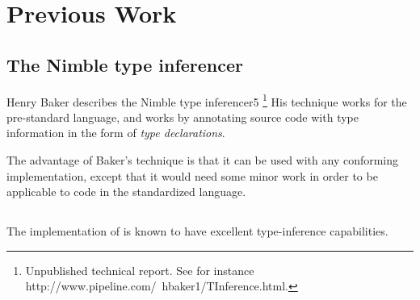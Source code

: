\section{Previous Work}

\subsection{The Nimble type inferencer}

Henry Baker describes the Nimble type inferencer5
\footnote{Unpublished technical report.  See for instance
  http://www.pipeline.com/~hbaker1/TInference.html.}  His technique
works for the pre-standard \commonlisp{} language, and works by
annotating source code with type information in the form of
\emph{type declarations}.

The advantage of Baker's technique is that it can be used with any
conforming \commonlisp{} implementation, except that it would need some
minor work in order to be applicable to code in the standardized
language.

\subsection{\sbcl{}}

The \sbcl{} implementation of \commonlisp{} is known to have excellent
type-inference capabilities.
